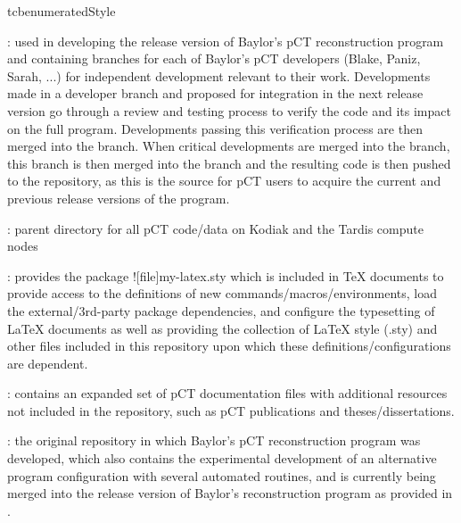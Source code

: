 \begin{tcbenvironment}
\begin{tcbparbox}{tcbenumeratedStyle}
\begin{ThinEnum}[parsep=\currentparsep]
\begin{ThinEnum}[parsep=\currentparsep]
        \item {} : used in developing the release version of Baylor's pCT reconstruction program and containing branches for each of Baylor's pCT developers (Blake, Paniz, Sarah, ...) for independent development relevant to their work.  Developments made in a developer branch and proposed for integration in the next release version go through a review and testing process to verify the code and its impact on the full program.  Developments passing this verification process are then merged into the  branch.  When critical developments are merged into the  branch, this branch is then merged into the  branch and the resulting code is then pushed to the  repository, as this is the source for pCT users to acquire the current and previous release versions of the program.
    \end{ThinEnum}
    \item {} : parent directory for all pCT code/data on Kodiak and the Tardis compute nodes
    \begin{ThinEnum}[parsep=\currentparsep]
        \item {} : provides the package \docentry![file]{my-latex.sty} which is included in TeX documents to provide access to the definitions of new commands/macros/environments, load the external/3rd-party package dependencies, and configure the typesetting of LaTeX documents as well as providing the collection of LaTeX style (.sty) and other files included in this repository upon which these definitions/configurations are dependent.
        \item {} : contains an expanded set of pCT documentation files with additional resources not included in the  repository, such as pCT publications and theses/dissertations.
        \item {} : the original repository in which Baylor's pCT reconstruction program was developed, which also contains the experimental development of an alternative program configuration with several automated routines, and is currently being merged into the release version of Baylor's reconstruction program as provided in .

\end{ThinEnum}
\end{ThinEnum}
\end{tcbparbox}
\end{tcbenvironment}
